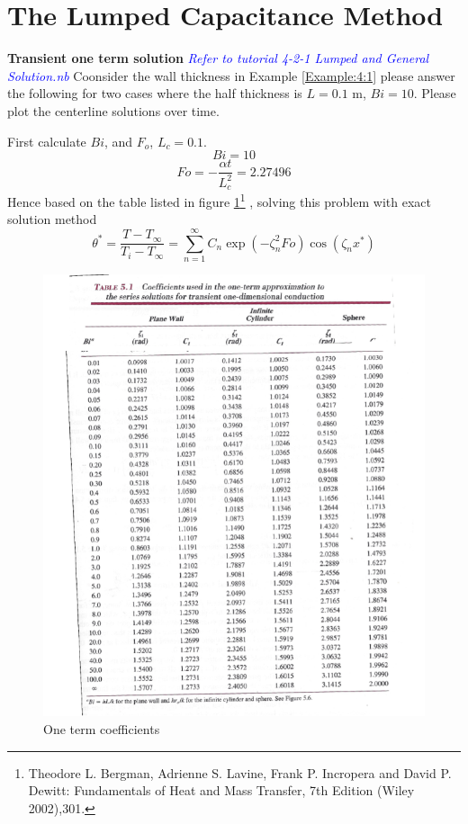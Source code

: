 \section{The Lumped Capacitance Method}
\begin{example}
\textbf{Transient one term solution}
\textcolor{blue} {\emph{ Refer to tutorial 4-2-1 Lumped and General Solution.nb}}
Coonsider the wall thickness in Example \ref{Example:4:1} please answer the following for two cases where the half thickness is $L =0.1$ m, $Bi=10$. Please plot the centerline solutions over time.
\end{example}
\begin{solution}
First calculate $Bi$, and $F_o$, $L_c= 0.1$.
$$Bi= 10$$
$$Fo=-\frac{\alpha t}{L_c^2}=2.27496$$
Hence based on the table listed in {figure \ref{fig:4:12}}\footnote{Theodore L. Bergman,  Adrienne S. Lavine, Frank P. Incropera and David P. Dewitt: Fundamentals of Heat and Mass Transfer, 7th Edition (Wiley 2002),301.} , solving this problem with exact solution method
$$\theta^*=\frac{T-T_\infty}{T_i-T_\infty}=\sum_{n=1}^{\infty}C_n\exp(-\zeta^2_nFo)\cos(\zeta_nx^*)$$ 

\begin{figure}[H]
  \centering
    \includegraphics[scale=1.2]{figures/ch4/12}
    \caption{One term coefficients}
    \label{fig:4:12}
\end{figure}



\end{solution}
